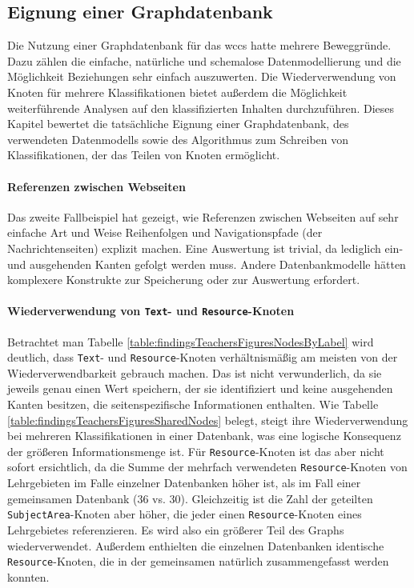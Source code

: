 \subsection{Eignung einer Graphdatenbank}
    Die Nutzung einer Graphdatenbank für das \gls{wccs} hatte mehrere Beweggründe.
    Dazu zählen die einfache, natürliche und schemalose Datenmodellierung
    und die Möglichkeit Beziehungen sehr einfach auszuwerten.
    Die Wiederverwendung von Knoten für mehrere Klassifikationen
    bietet außerdem die Möglichkeit weiterführende Analysen auf den
    klassifizierten Inhalten durchzuführen.
    Dieses Kapitel bewertet die tatsächliche Eignung einer Graphdatenbank,
    des verwendeten Datenmodells sowie des Algorithmus
    zum Schreiben von Klassifikationen, der das Teilen von Knoten ermöglicht.

    \paragraph{Referenzen zwischen Webseiten}
    Das zweite Fallbeispiel hat gezeigt,
    wie Referenzen zwischen Webseiten auf sehr einfache Art und Weise
    Reihenfolgen und Navigationspfade (der Nachrichtenseiten) explizit machen.
    Eine Auswertung ist trivial, da lediglich ein- und ausgehenden Kanten gefolgt werden muss.
    Andere Datenbankmodelle hätten komplexere Konstrukte
    zur Speicherung oder zur Auswertung erfordert.

    \paragraph{Wiederverwendung von \texttt{Text}- und \texttt{Resource}-Knoten}
    Betrachtet man Tabelle \ref{table:findingsTeachersFiguresNodesByLabel} wird deutlich,
    dass \texttt{Text}- und \texttt{Resource}-Knoten verhältnismäßig am meisten von der
    Wiederverwendbarkeit gebrauch machen.
    Das ist nicht verwunderlich, da sie jeweils genau einen Wert speichern,
    der sie identifiziert und keine ausgehenden Kanten besitzen,
    die seitenspezifische Informationen enthalten.
    Wie Tabelle \ref{table:findingsTeachersFiguresSharedNodes} belegt,
    steigt ihre Wiederverwendung bei mehreren Klassifikationen in einer Datenbank,
    was eine logische Konsequenz der größeren Informationsmenge ist.
    Für \texttt{Resource}-Knoten ist das aber nicht sofort ersichtlich, da
    die Summe der mehrfach verwendeten \texttt{Resource}-Knoten von Lehrgebieten
    im Falle einzelner Datenbanken höher ist, als im Fall einer gemeinsamen Datenbank (36 vs. 30).
    Gleichzeitig ist die Zahl der geteilten \texttt{SubjectArea}-Knoten aber höher,
    die jeder einen \texttt{Resource}-Knoten eines Lehrgebietes referenzieren.
    Es wird also ein größerer Teil des Graphs wiederverwendet.
    Außerdem enthielten die einzelnen Datenbanken identische \texttt{Resource}-Knoten,
    die in der gemeinsamen natürlich zusammengefasst werden konnten.

